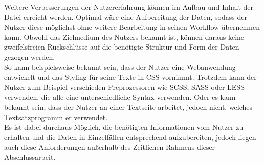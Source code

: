 
Weitere Verbesserungen der Nutzererfahrung können im Aufbau und Inhalt der Datei erreicht werden. Optimal wäre eine Aufbereitung der Daten, sodass der Nutzer diese möglichst ohne weitere Bearbeitung in seinen Workflow übernehmen kann. Obwohl das Zielmedium des Nutzers bekannt ist, können daraus keine zweifelsfreien Rückschlüsse auf die benötigte Struktur und Form der Daten gezogen werden. \\
So kann beispielsweise bekannt sein, dass der Nutzer eine Webanwendung entwickelt und das Styling für seine Texte in CSS vornimmt. Trotzdem kann der Nutzer zum Beispiel verschieden Preprozessoren wie SCSS, SASS oder LESS verwenden, die alle eine unterschiedliche Syntax verwenden.
Oder es kann bekannt sein, dass der Nutzer an einer Textseite arbeitet, jedoch nicht, welches Textsatzprogramm er verwendet\footnotemark{}.\\
Es ist dabei durchaus Möglich, die benötigten Informationen vom Nutzer zu erhalten und die Daten in Einzelfällen entsprechend aufzubereiten, jedoch liegen auch diese Anforderungen außerhalb des Zeitlichen Rahmens dieser Abschlussarbeit.
